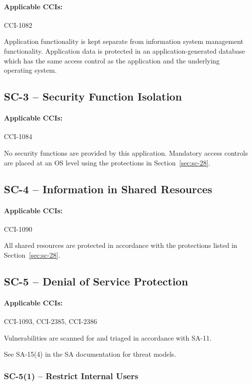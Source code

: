 \documentclass[letterpaper, 10pt, twoside]{article}
\begin{document}
\paragraph{Applicable CCIs:} CCI-1082

Application functionality is kept separate from information system management functionality. Application data is protected in an application-generated database which has the same access control as the application and the underlying operating system.

\subsection{SC-3 -- Security Function Isolation}

\paragraph{Applicable CCIs:} CCI-1084

No security functions are provided by this application. Mandatory access controls are placed at an OS level using the protections in Section~\ref{sec:sc-28}.

\subsection{SC-4 -- Information in Shared Resources}

\paragraph{Applicable CCIs:} CCI-1090

All shared resources are protected in accordance with the protections listed in Section~\ref{sec:sc-28}.

\subsection{SC-5 -- Denial of Service Protection}
\label{sec:sc-5}

\paragraph{Applicable CCIs:} CCI-1093, CCI-2385, CCI-2386

Vulnerabilities are scanned for and triaged in accordance with SA-11.

See SA-15(4) in the SA documentation for threat models.

\subsubsection{SC-5(1) -- Restrict Internal Users}
\end{document}
